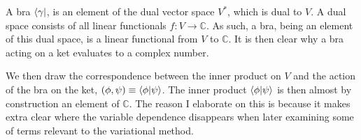 \documentclass[12pt]{article}
\numberwithin{equation}{section}
\begin{document}
\hspace{1cm} A bra $\bra{\gamma}$, is an element of the dual vector space $V^*$, which is dual to $V$. A dual space consists of all linear functionals $f : V \rightarrow \mathbb{C}$. As such, a bra, being an element of this dual space, is a linear functional from $V$ to $\mathbb{C}$. It is then clear why a bra acting on a ket evaluates to a complex number.

\hspace{1cm} We then draw the correspondence between the inner product on $V$ and the action of the bra on the ket, $(\phi, \psi) \equiv \braket{\phi | \psi}$. The inner product $\braket{\phi | \psi}$ is then almost by construction an element of $\mathbb{C}$. The reason I elaborate on this is because it makes extra clear where the variable dependence disappears when later examining some of terms relevant to the variational method. 
\end{document}
